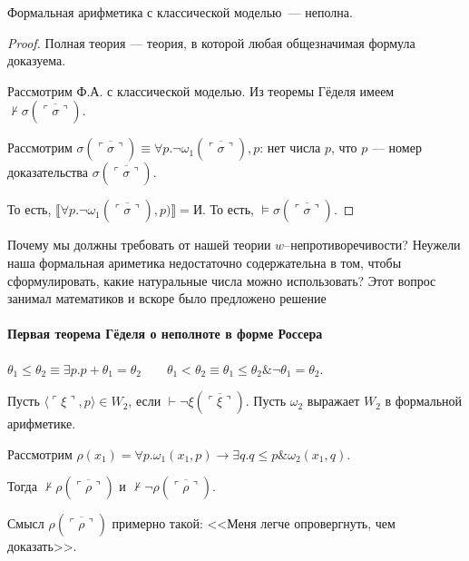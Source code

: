 \begin{theorem}
    Формальная арифметика с классической моделью~--- неполна.
\end{theorem}
\begin{proof}
Полная теория --- теория, в которой любая общезначимая формула доказуема.

Рассмотрим Ф.А. с классической моделью.
Из теоремы Гёделя имеем $\not\vdash\sigma(\overline{\ulcorner\sigma\urcorner})$.

Рассмотрим $\sigma(\overline{\ulcorner\sigma\urcorner}) \equiv \forall p.\neg\omega_1(\overline{\ulcorner\sigma\urcorner}),p$:
нет числа $p$, что $p$ --- номер доказательства $\sigma(\overline{\ulcorner\sigma\urcorner})$.

То есть, $\llbracket \forall p.\neg\omega_1(\overline{\ulcorner\sigma\urcorner}),p) \rrbracket = \text{И}$.
То есть, $\models \sigma(\overline{\ulcorner\sigma\urcorner})$.
\end{proof}

Почему мы должны требовать от нашей теории $w$--непротиворечивости? Неужели наша формальная ариметика недостаточно содержательна в том, чтобы сформулировать, какие  натуральные числа можно использовать? Этот вопрос занимал математиков и вскоре было предложено решение

\paragraph{Первая теорема Гёделя о неполноте в форме Россера}
\begin{definition}
    $\theta_1\le\theta_2 \equiv \exists p.p+\theta_1=\theta_2\quad\quad\theta_1<\theta_2\equiv\theta_1\le\theta_2\&\neg\theta_1=\theta_2$.
\end{definition}
\begin{definition}
    Пусть $\langle \ulcorner\xi\urcorner,p\rangle \in W_2$, если $\vdash\neg\xi(\overline{\ulcorner\xi\urcorner})$.
Пусть $\omega_2$ выражает $W_2$ в формальной арифметике.
\end{definition}
\begin{theorem}
    Рассмотрим $\rho(x_1) = \forall p.\omega_1(x_1,p)\rightarrow\exists q.q \le p \& \omega_2 (x_1, q)$.

    Тогда $\not\vdash\rho(\overline{\ulcorner\rho\urcorner})$ и $\not\vdash\neg\rho(\overline{\ulcorner\rho\urcorner})$.
\end{theorem}
\begin{note}
    Смысл $\rho(\overline{\ulcorner\rho\urcorner})$ примерно такой: <<Меня легче опровергнуть, чем доказать>>.
\end{note}


